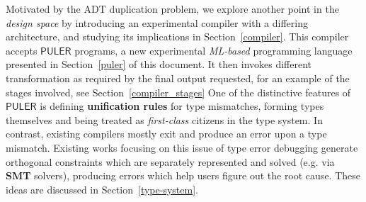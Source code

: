\documentclass{article} %
\newcommand{\PULER}{\mathsf{PULER}}
\begin{document}
    Motivated by the ADT duplication problem, we explore another point in the \textit{design space} by introducing an experimental compiler with a differing architecture, and studying its implications in Section~\ref{compiler}.
    This compiler accepts $\PULER$ programs, a new experimental \textit{ML-based} programming language presented in Section~\ref{puler} of this document.
    It then invokes different transformation as required by the final output requested, for an example of the stages involved, see Section~\ref{compiler_stages}
    One of the distinctive features of $\PULER$ is defining \textbf{unification rules} for type mismatches, forming types themselves and being treated as \textit{first-class} citizens in the type system.
    In contrast, existing compilers mostly exit and produce an error upon a type mismatch.
    Existing works focusing on this issue of type error debugging \cite{min_type_error} generate orthogonal constraints which are separately represented and solved (e.g. via \textbf{SMT} solvers), producing errors which help users figure out the root cause. These ideas are discussed in Section~\ref{type-system}.
    
\end{document}
